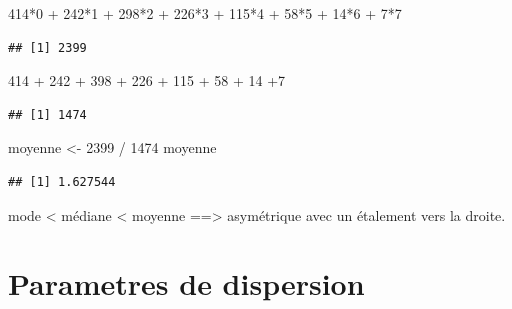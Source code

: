 \documentclass[
]{article}
\newenvironment{Shaded}{\begin{snugshade}}{\end{snugshade}}
\newcommand{\DecValTok}[1]{\textcolor[rgb]{0.00,0.00,0.81}{#1}}
\newcommand{\NormalTok}[1]{#1}
\newcommand{\OtherTok}[1]{\textcolor[rgb]{0.56,0.35,0.01}{#1}}
\newcommand{\SpecialCharTok}[1]{\textcolor[rgb]{0.00,0.00,0.00}{#1}}
\begin{document}
\begin{Shaded}
\begin{Highlighting}[]
\DecValTok{414}\SpecialCharTok{*}\DecValTok{0} \SpecialCharTok{+} \DecValTok{242}\SpecialCharTok{*}\DecValTok{1} \SpecialCharTok{+} \DecValTok{298}\SpecialCharTok{*}\DecValTok{2} \SpecialCharTok{+} \DecValTok{226}\SpecialCharTok{*}\DecValTok{3} \SpecialCharTok{+} \DecValTok{115}\SpecialCharTok{*}\DecValTok{4} \SpecialCharTok{+} \DecValTok{58}\SpecialCharTok{*}\DecValTok{5} \SpecialCharTok{+} \DecValTok{14}\SpecialCharTok{*}\DecValTok{6} \SpecialCharTok{+} \DecValTok{7}\SpecialCharTok{*}\DecValTok{7}
\end{Highlighting}
\end{Shaded}

\begin{verbatim}
## [1] 2399
\end{verbatim}

\begin{Shaded}
\begin{Highlighting}[]
\DecValTok{414} \SpecialCharTok{+} \DecValTok{242} \SpecialCharTok{+} \DecValTok{398} \SpecialCharTok{+} \DecValTok{226} \SpecialCharTok{+} \DecValTok{115} \SpecialCharTok{+} \DecValTok{58} \SpecialCharTok{+} \DecValTok{14} \SpecialCharTok{+}\DecValTok{7}
\end{Highlighting}
\end{Shaded}

\begin{verbatim}
## [1] 1474
\end{verbatim}

\begin{Shaded}
\begin{Highlighting}[]
\NormalTok{moyenne }\OtherTok{\textless{}{-}} \DecValTok{2399} \SpecialCharTok{/} \DecValTok{1474}
\NormalTok{moyenne }
\end{Highlighting}
\end{Shaded}

\begin{verbatim}
## [1] 1.627544
\end{verbatim}

mode \textless{} médiane \textless{} moyenne ==\textgreater{}
asymétrique avec un étalement vers la droite.

\hypertarget{parametres-de-dispersion}{%
\section{Parametres de dispersion}\label{parametres-de-dispersion}}
\end{document}
